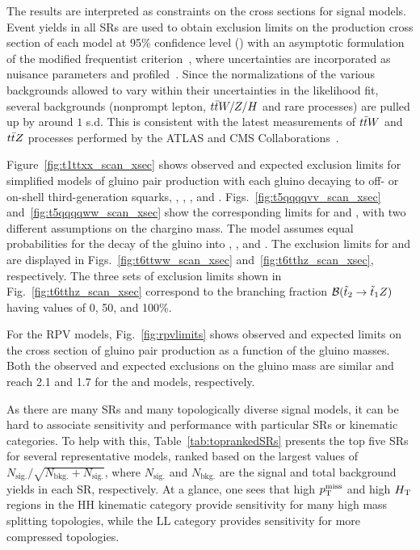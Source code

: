 The results are interpreted as constraints on the cross sections for signal
models. Event yields in all SRs are used to obtain exclusion limits on the
production cross section of each model at 95\% confidence level (\CL) with an
asymptotic formulation of the modified frequentist \CLs
criterion~\cite{STAT:Junk1999kv,STAT:Read2002hq,STAT:ATLPHYSPUB2011011,STAT:Cowan2010js},
where uncertainties are incorporated as nuisance parameters and
profiled~\cite{STAT:ATLPHYSPUB2011011}. Since the normalizations of the
various backgrounds allowed to vary within their uncertainties in the
likelihood fit, several backgrounds (nonprompt lepton, $t\bar{t} W/Z/H$
and rare processes) are pulled up by around $1$ s.d. This is consistent with
the latest measurements of $t\bar{t} W$ and $t\bar{t} Z$ processes performed
by the ATLAS and CMS Collaborations~\cite{ATLAS:ttV,CMS:ttV}.


Figure~\ref{fig:t1ttxx_scan_xsec} shows observed and expected exclusion
limits for simplified models of gluino pair production with each gluino
decaying to off- or on-shell third-generation squarks, \Totttt, \TfttbbWW,
\Tftttt, and \Tfttcc. Figs.~\ref{fig:t5qqqqvv_scan_xsec}
and~\ref{fig:t5qqqqww_scan_xsec} show the corresponding limits for \TfqqqqWZ
and \TfqqqqWW, with two different assumptions on the chargino mass. The
\TfqqqqWZ model assumes equal probabilities for the decay of the gluino into
\chiplus, \chiminus, and \neutralinotwo. The exclusion limits for \TsttWW and
\TsttHZ are displayed in Figs.~\ref{fig:t6ttww_scan_xsec}
and~\ref{fig:t6tthz_scan_xsec}, respectively. The three sets of exclusion
limits shown in Fig.~\ref{fig:t6tthz_scan_xsec} correspond to the branching
fraction $\mathcal{B}(\tilde{t}_2\to\tilde{t}_1Z)$ having values of 0, 50,
and 100\%.

For the RPV models, Fig.~\ref{fig:rpvlimits} 
shows observed and expected limits on the
cross section of gluino pair production as a function of the gluino masses.
Both the observed and expected exclusions on the gluino mass
are similar and reach 2.1 and 1.7 \TeV for the \ToqqqqL and \Totbs models,
respectively.

As there are many SRs and many topologically diverse signal models,
it can be hard to associate sensitivity and performance with particular
SRs or kinematic categories. To help with this,
Table~\ref{tab:toprankedSRs} presents the top five SRs for several
representative models, ranked based on the largest values of
$N_\text{sig.}/\sqrt{N_\text{bkg.} + N_\text{sig.}}$, where $N_\text{sig.}$
and $N_\text{bkg.}$ are the signal and total background yields in each SR,
respectively. At a glance, one sees that high $p_{\mathrm{T}}^\text{miss}$ and high $H_{\mathrm{T}}$ regions
in the HH kinematic category provide sensitivity for many high mass splitting
topologies, while the LL category provides sensitivity for more compressed
topologies.

